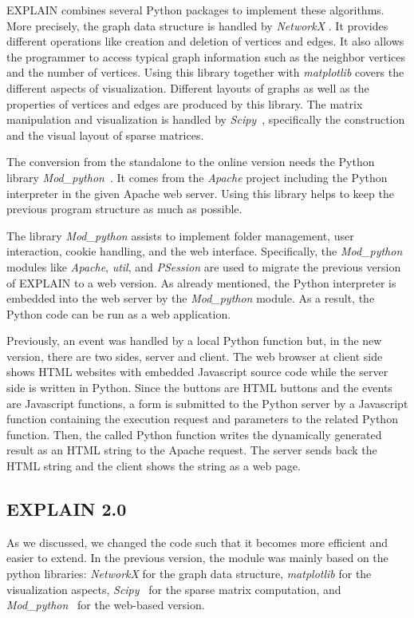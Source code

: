 \documentclass[12pt, oneside]{book}
\begin{document}
\mbox{EXPLAIN} combines several Python packages to implement these algorithms. More precisely, the graph data structure is handled by \textit{NetworkX} \cite{networkx2008}. It provides different operations like creation and deletion of vertices and edges. It also allows the programmer to access typical graph information such as the neighbor vertices and the number of vertices. Using this library together with  \textit{matplotlib} \cite{matplotlib2007} covers the different aspects of visualization. Different layouts of graphs as well as the properties of vertices and edges are produced by this library. The matrix manipulation and visualization is handled by \textit{Scipy}~\cite{scipy2001}, specifically the construction and the visual layout of sparse matrices.

The conversion from the standalone to the online version needs the Python library \textit{Mod\_python}~\cite{modpython2013}. It comes from the \textit{Apache} project including the Python interpreter in the given Apache web server. Using this library helps to keep the previous program structure as much as possible.

The library \textit{Mod\_python} assists to implement folder management, user interaction, cookie handling, and the web interface. Specifically, the \textit{Mod\_python} modules like \textit{Apache}, \textit{util}, and \textit{PSession} are used to migrate the previous version of \mbox{EXPLAIN} to a web version. As already mentioned, the Python interpreter is embedded into the web server by the \textit{Mod\_python} module. As a result, the Python code can be run as a web application.

Previously, an event was handled by a local Python function but, in the new version, there are two sides, server and client. The web browser at client side shows HTML websites with embedded  Javascript source code while the server side is written in Python. Since the buttons are HTML buttons and the events are Javascript functions, a form is submitted to the Python server by a Javascript function containing the execution request and parameters to the related Python function. Then, the called Python function writes the dynamically generated result as an HTML string to the Apache request. The server sends back the HTML string and the client shows the string as a web page.

\subsection{EXPLAIN 2.0}
\label{s.impl.explain2}
As we discussed, we changed the code such that it becomes more efficient and easier to extend. 
In the previous version, the module was mainly based on the python libraries:
\textit{NetworkX} \cite{networkx2008} for the graph data structure,
\textit{matplotlib} \cite{matplotlib2007} for the visualization aspects,
\textit{Scipy}~\cite{scipy2001} for the sparse matrix computation, and
\textit{Mod\_python}~\cite{modpython2013} for the web-based version. 
\end{document}
